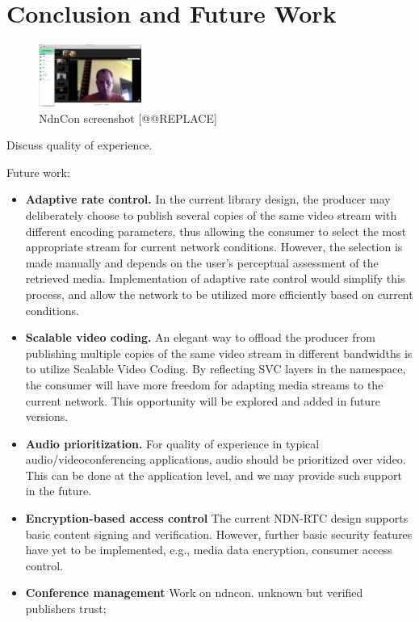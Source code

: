 \documentclass{icn/sig-alternate-2012} %
\newcommand{\ndnrtcName}{NDN-RTC} %
\newcommand{\ndnconName}{NdnCon}
\begin{document}
\section{Conclusion and Future Work}
\label{sec:conclusion}

\begin{figure}[t!]
\centering
\includegraphics[width=0.3\textwidth]{ndncon}
\caption{\ndnconName{} screenshot [@@REPLACE]}
\label{fig:ndncon}
\end{figure}


Discuss quality of experience. 

Future work: 
\begin{itemize}[label={}]
\item \textbf{Adaptive rate control.} In the current library design, the producer may deliberately choose to publish several copies of the same video stream with different encoding parameters, thus allowing the consumer to select the most appropriate stream for current network conditions. However, the selection is made manually and depends on the user's perceptual assessment of the retrieved media. Implementation of adaptive rate control would simplify this process, and allow the network to be utilized more efficiently based on current conditions.

\item \textbf{Scalable video coding.} An elegant way to offload the producer from publishing multiple copies of the same video stream in different bandwidths is to utilize Scalable Video Coding. By reflecting SVC layers in the namespace, the consumer will have more freedom for adapting media streams to the current network. This opportunity will be explored and added in future versions.

\item \textbf{Audio prioritization.}  For quality of experience in typical audio/videoconferencing applications, audio should be prioritized over video.  This can be done at the application level, and we may provide such support in the future. %

\item \textbf{Encryption-based access control} The current \ndnrtcName{} design supports basic content signing and verification. However, further basic security features have yet to be implemented, e.g., media data encryption, consumer access control.

\item \textbf{Conference management} 
Work on ndncon. unknown but verified publishers trust; 
\end{itemize}
\end{document}
